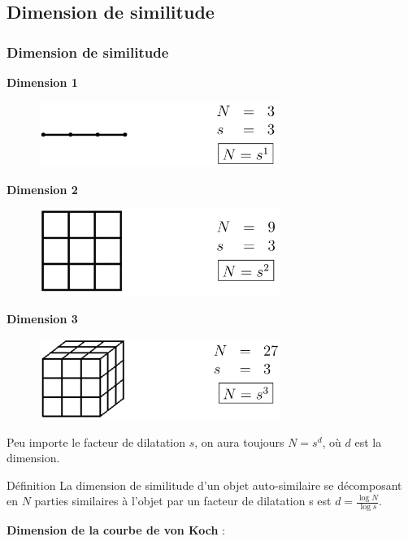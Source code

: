 \documentclass[aspectratio=1610]{beamer}
\begin{document}
\subsection{Dimension de similitude}
\begin{frame}
\frametitle{Dimension de similitude}
\begin{description}
\begin{minipage}[b]{0.3\textwidth}
    \item[] \textbf{Dimension 1}
    \begin{figure}[h]
        \includegraphics[width=0.7\textwidth,left]{IMG_1489}
        \label{fig:IMG_1489}
    \end{figure}
\end{minipage}%
\begin{minipage}[b]{0.3\textwidth}
    \item[] \textbf{Dimension 2}
    \begin{figure}[h]
        \includegraphics[width=0.7\textwidth,left]{IMG_1490}
        \label{fig:IMG_1490}
    \end{figure}
\end{minipage}%
\begin{minipage}[b]{0.3\textwidth}
    \item[] \textbf{Dimension 3}
    \begin{figure}[h]
        \includegraphics[width=0.7\textwidth,left]{IMG_1491}
        \label{fig:IMG_1491}
    \end{figure}
\end{minipage}
\end{description}
Peu importe le facteur de dilatation $s$, on aura toujours  $N=s^{d}$, où $d$ est la dimension.
\begin{block}{Définition}
    La dimension de similitude d'un objet auto-similaire se décomposant en $N$ parties similaires à l'objet par un facteur de dilatation s est $d=\frac{\log N}{\log s}$.
\end{block}    
\textbf{Dimension de la courbe de von Koch} :


\end{frame}
\end{document}
